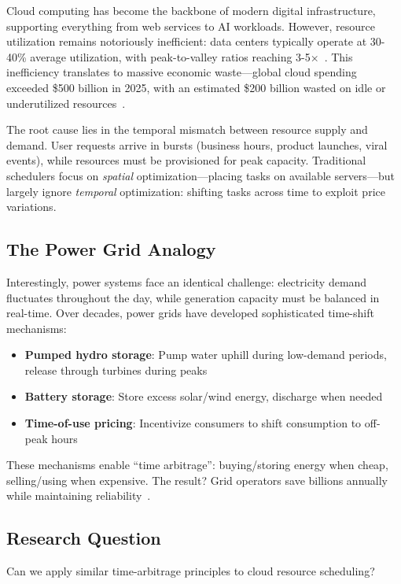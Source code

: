 \documentclass[10pt,conference]{IEEEtran}
\begin{document}
Cloud computing has become the backbone of modern digital infrastructure, supporting everything from web services to AI workloads. However, resource utilization remains notoriously inefficient: data centers typically operate at 30-40\% average utilization, with peak-to-valley ratios reaching 3-5$\times$~\cite{barroso2013datacenter}. This inefficiency translates to massive economic waste—global cloud spending exceeded \$500 billion in 2025, with an estimated \$200 billion wasted on idle or underutilized resources~\cite{gartner2025cloud}.

The root cause lies in the temporal mismatch between resource supply and demand. User requests arrive in bursts (business hours, product launches, viral events), while resources must be provisioned for peak capacity. Traditional schedulers focus on \textit{spatial} optimization—placing tasks on available servers—but largely ignore \textit{temporal} optimization: shifting tasks across time to exploit price variations.

\subsection{The Power Grid Analogy}

Interestingly, power systems face an identical challenge: electricity demand fluctuates throughout the day, while generation capacity must be balanced in real-time. Over decades, power grids have developed sophisticated time-shift mechanisms:
\begin{itemize}
    \item \textbf{Pumped hydro storage}: Pump water uphill during low-demand periods, release through turbines during peaks
    \item \textbf{Battery storage}: Store excess solar/wind energy, discharge when needed
    \item \textbf{Time-of-use pricing}: Incentivize consumers to shift consumption to off-peak hours
\end{itemize}

These mechanisms enable ``time arbitrage'': buying/storing energy when cheap, selling/using when expensive. The result? Grid operators save billions annually while maintaining reliability~\cite{denholm2016value}.

\subsection{Research Question}

Can we apply similar time-arbitrage principles to cloud resource scheduling?
\end{document}
